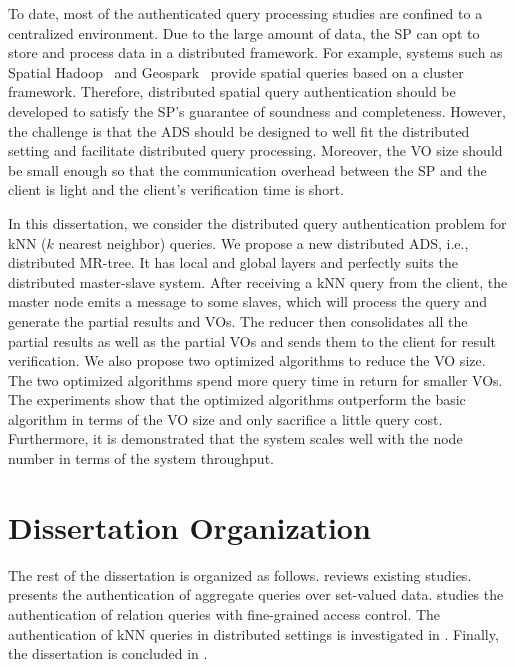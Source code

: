 To date, most of the authenticated query processing studies are confined to a centralized environment. Due to the large amount of data, the SP can opt to store and process data in a distributed framework. For example, systems such as Spatial Hadoop~\cite{10.1109/icde.2015.7113382} and Geospark~\cite{10.1145/2820783.2820860} provide spatial queries based on a cluster framework. Therefore, distributed spatial query authentication should be developed to satisfy the SP's guarantee of soundness and completeness. However, the challenge is that the ADS should be designed to well fit the distributed setting and facilitate distributed query processing. Moreover, the VO size should be small enough so that the communication overhead between the SP and the client is light and the client's verification time is short.

In this dissertation, we consider the distributed query authentication problem for kNN ($k$ nearest neighbor) queries. We propose a new distributed ADS, i.e., distributed MR-tree. It has local and global layers and perfectly suits the distributed master-slave system. After receiving a kNN query from the client, the master node emits a message to some slaves, which will process the query and generate the partial results and VOs. The reducer then consolidates all the partial results as well as the partial VOs and sends them to the client for result verification. We also propose two optimized algorithms to reduce the VO size. The two optimized algorithms spend more query time in return for smaller VOs. The experiments show that the optimized algorithms outperform the basic algorithm in terms of the VO size and only sacrifice a little query cost. Furthermore, it is demonstrated that the system scales well with the node number in terms of the system throughput.

\section{Dissertation Organization}

The rest of the dissertation is organized as follows.  reviews existing studies.  presents the authentication of aggregate queries over set-valued data.  studies the authentication of relation queries with fine-grained access control. The authentication of {kNN} queries in distributed settings is investigated in . Finally, the dissertation is concluded in .
